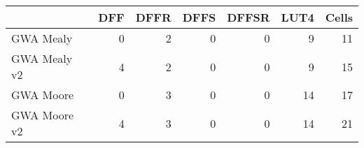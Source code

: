 % 
% 
\begin{tabular}{l|*{5}{r}|r}
  & DFF & DFFR & DFFS & DFFSR & LUT4 & Cells\\
\hline
GWA Mealy  & 0 & 2 & 0 & 0 & 9 & 11 \\
GWA Mealy v2  & 4 & 2 & 0 & 0 & 9 & 15 \\
GWA Moore  & 0 & 3 & 0 & 0 & 14 & 17 \\
GWA Moore v2  & 4 & 3 & 0 & 0 & 14 & 21 \\
\end{tabular}
